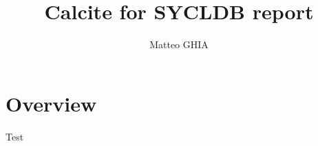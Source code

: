 \documentclass[a4paper, 10pt]{article}
\title{Calcite for SYCLDB report}
\author{Matteo GHIA}
\begin{document}
\maketitle

\section{Overview}
Test
\end{document}
